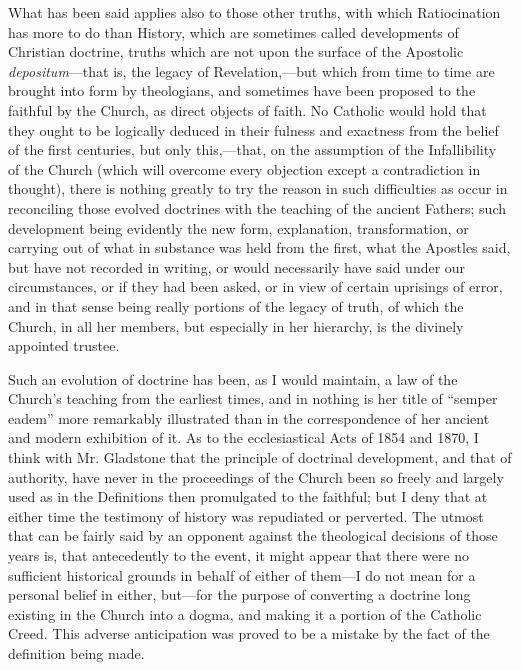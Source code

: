 What has been said applies also to those other truths, with which
Ratiocination has more to do than History, which are sometimes called
developments of Christian doctrine, truths which are not upon the
surface of the Apostolic \emph{depositum}—that is, the legacy of
Revelation,—but which from time to time are brought into form by
theologians, and sometimes have been proposed to the faithful by
the Church, as direct objects of faith. No Catholic would hold that they
ought to be logically deduced in their fulness and exactness from the
belief of the first centuries, but only this,—that, on the assumption
of the Infallibility of the Church (which will overcome every objection
except a contradiction in thought), there is nothing greatly to try the
reason in such difficulties as occur in reconciling those evolved
doctrines with the teaching of the ancient Fathers; such development
being evidently the new form, explanation, transformation, or carrying
out of what in substance was held from the first, what the Apostles
said, but have not recorded in writing, or would necessarily have said
under our circumstances, or if they had been asked, or in view of
certain uprisings of error, and in that sense being really portions of
the legacy of truth, of which the Church, in all her members, but
especially in her hierarchy, is the divinely appointed trustee.

Such an evolution of doctrine has been, as I would maintain, a law of
the Church's teaching from the earliest times, and in nothing is her
title of ``semper eadem'' more remarkably illustrated than in
the correspondence of her ancient and modern exhibition of it. As to the
ecclesiastical Acts of 1854 and 1870, I think with Mr. Gladstone that
the principle of doctrinal development, and that of authority, have
never in the proceedings of the Church been so freely and largely used
as in the Definitions then promulgated to the faithful; but I deny that
at either time the testimony of history was repudiated or perverted. The
utmost that can be fairly said by an opponent against the theological
decisions of those years is, that antecedently to the event, it
might appear that there were no sufficient historical grounds in behalf
of either of them—I do not mean for a personal belief in either, but—for the purpose of converting a doctrine long existing in the Church
into a dogma, and making it a portion of the Catholic Creed. This
adverse anticipation was proved to be a mistake by the fact of the
definition being made.

